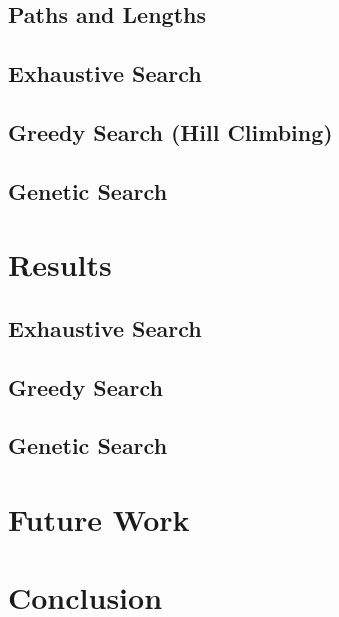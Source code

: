 \documentclass[10pt, conference, compsocconf]{IEEEtran}
\begin{document}
\subsection{Paths and Lengths}

\subsection{Exhaustive Search}

\subsection{Greedy Search (Hill Climbing)}

\subsection{Genetic Search}


\section{Results}

\subsection{Exhaustive Search}

\subsection{Greedy Search}

\subsection{Genetic Search}

\section{Future Work}


\section{Conclusion}
\end{document}
